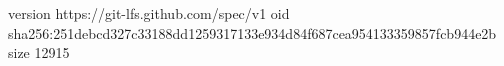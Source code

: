 version https://git-lfs.github.com/spec/v1
oid sha256:251debcd327c33188dd1259317133e934d84f687cea954133359857fcb944e2b
size 12915
